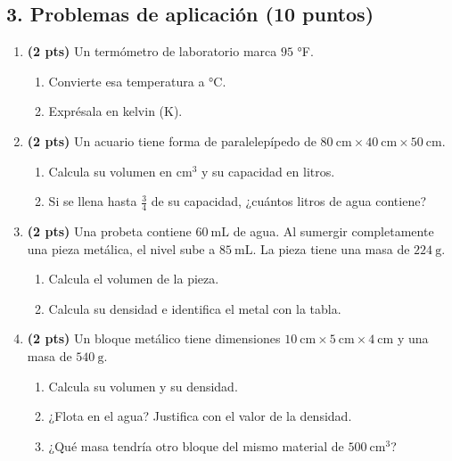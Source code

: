 \documentclass[12pt, letterpaper]{article}
\begin{document}
\newpage
\subsection*{3. Problemas de aplicación (10 puntos)}

\begin{enumerate}[leftmargin=*, label=\textbf{\arabic*.}, itemsep=1.0em]

  \item \textbf{(2 pts)} Un termómetro de laboratorio marca $95$ °F.
        \begin{enumerate}[label=\alph*), leftmargin=1.8em, itemsep=0.3em]
          \item Convierte esa temperatura a °C.
          \item Exprésala en kelvin (K).
        \end{enumerate}
        \vspace{1.6cm}

  \item \textbf{(2 pts)} Un acuario tiene forma de paralelepípedo de
        $80\ \text{cm}\times40\ \text{cm}\times50\ \text{cm}$.
        \begin{enumerate}[label=\alph*), leftmargin=1.8em, itemsep=0.3em]
          \item Calcula su volumen en $\text{cm}^3$ y su capacidad en litros.
          \item Si se llena hasta $\frac{3}{4}$ de su capacidad, ¿cuántos litros de agua contiene?
        \end{enumerate}
        \vspace{1.8cm}

  \item \textbf{(2 pts)} Una probeta contiene $60\ \text{mL}$ de agua. Al sumergir
        completamente una pieza metálica, el nivel sube a $85\ \text{mL}$.
        La pieza tiene una masa de $224\ \text{g}$.
        \begin{enumerate}[label=\alph*), leftmargin=1.8em, itemsep=0.3em]
          \item Calcula el volumen de la pieza.
          \item Calcula su densidad e identifica el metal con la tabla.
        \end{enumerate}
        \vspace{1.8cm}

  \item \textbf{(2 pts)} Un bloque metálico tiene dimensiones
        $10\ \text{cm}\times5\ \text{cm}\times4\ \text{cm}$ y una masa de $540\ \text{g}$.
        \begin{enumerate}[label=\alph*), leftmargin=1.8em, itemsep=0.3em]
          \item Calcula su volumen y su densidad.
          \item ¿Flota en el agua? Justifica con el valor de la densidad.
          \item ¿Qué masa tendría otro bloque del mismo material de $500\ \text{cm}^3$?
        \end{enumerate}
        \vspace{1.8cm}


\end{enumerate}
\end{document}
